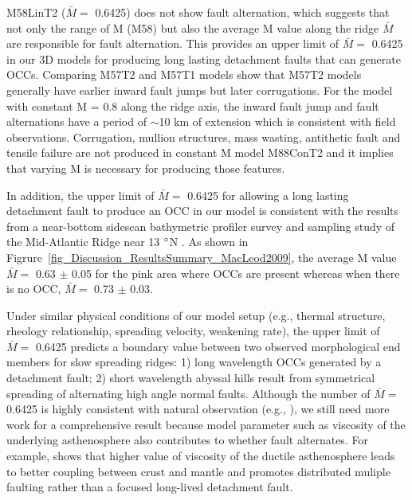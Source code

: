 \documentclass[draft,gc]{agutex}
\begin{document}
\begin{article}
M58LinT2 ($\bar{M} =$ 0.6425) does not show fault alternation, which suggests that not only the range of M (M58) but also the average M value along the ridge $\bar{M}$ are responsible for fault alternation. This provides an upper limit of $\bar{M} =$ 0.6425 in our 3D models for producing long lasting detachment faults that can generate OCCs. Comparing M57T2 and M57T1 models show that M57T2 models generally have earlier inward fault jumps but later corrugations. For the model with constant M = 0.8 along the ridge axis, the inward fault jump and fault alternations have a period of $\sim$10 km of extension which is consistent with field observations. Corrugation, mullion structures, mass wasting, antithetic fault and tensile failure are not produced in constant M model M88ConT2 and it implies that varying M is necessary for producing those features.

In addition, the upper limit of $\bar{M} = $ 0.6425 for allowing a long lasting detachment fault to produce an OCC in our model is consistent with the results from a near-bottom sidescan bathymetric profiler survey and sampling study of the Mid-Atlantic Ridge near 13 $\degree$N \citep{MacLeod2009}. As shown in Figrure~\ref{fig_Discussion_ResultsSummary_MacLeod2009}, the average M value $\bar{M} =$ 0.63 $\pm$ 0.05 for the pink area where OCCs are present whereas when there is no OCC, $\bar{M} =$ 0.73 $\pm$ 0.03.

Under similar physical conditions of our model setup (e.g., thermal structure, rheology relationship, spreading velocity, weakening rate), the upper limit of $\bar{M} = $ 0.6425 predicts a boundary value between two observed morphological end members for slow spreading ridges: 1) long wavelength OCCs generated by a detachment fault; 2) short wavelength abyssal hills result from symmetrical spreading of alternating high angle normal faults. Although the number of $\bar{M} = $ 0.6425 is highly consistent with natural observation (e.g., \citep{MacLeod2009}), we still need more work for a comprehensive result because model parameter such as viscosity of the underlying asthenosphere also contributes to whether fault alternates. For example, \citep{Allken2012} shows that higher value of viscosity of the ductile asthenosphere leads to better coupling between crust and mantle and promotes distributed muliple faulting rather than a focused long-lived detachment fault.


\end{article}
\end{document}
